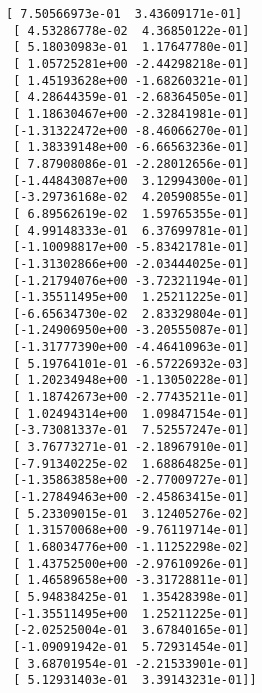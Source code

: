 \documentclass[11pt]{article}
\begin{document}
\begin{Verbatim}[commandchars=\\\{\}]
 [ 7.50566973e-01  3.43609171e-01]
 [ 4.53286778e-02  4.36850122e-01]
 [ 5.18030983e-01  1.17647780e-01]
 [ 1.05725281e+00 -2.44298218e-01]
 [ 1.45193628e+00 -1.68260321e-01]
 [ 4.28644359e-01 -2.68364505e-01]
 [ 1.18630467e+00 -2.32841981e-01]
 [-1.31322472e+00 -8.46066270e-01]
 [ 1.38339148e+00 -6.66563236e-01]
 [ 7.87908086e-01 -2.28012656e-01]
 [-1.44843087e+00  3.12994300e-01]
 [-3.29736168e-02  4.20590855e-01]
 [ 6.89562619e-02  1.59765355e-01]
 [ 4.99148333e-01  6.37699781e-01]
 [-1.10098817e+00 -5.83421781e-01]
 [-1.31302866e+00 -2.03444025e-01]
 [-1.21794076e+00 -3.72321194e-01]
 [-1.35511495e+00  1.25211225e-01]
 [-6.65634730e-02  2.83329804e-01]
 [-1.24906950e+00 -3.20555087e-01]
 [-1.31777390e+00 -4.46410963e-01]
 [ 5.19764101e-01 -6.57226932e-03]
 [ 1.20234948e+00 -1.13050228e-01]
 [ 1.18742673e+00 -2.77435211e-01]
 [ 1.02494314e+00  1.09847154e-01]
 [-3.73081337e-01  7.52557247e-01]
 [ 3.76773271e-01 -2.18967910e-01]
 [-7.91340225e-02  1.68864825e-01]
 [-1.35863858e+00 -2.77009727e-01]
 [-1.27849463e+00 -2.45863415e-01]
 [ 5.23309015e-01  3.12405276e-02]
 [ 1.31570068e+00 -9.76119714e-01]
 [ 1.68034776e+00 -1.11252298e-02]
 [ 1.43752500e+00 -2.97610926e-01]
 [ 1.46589658e+00 -3.31728811e-01]
 [ 5.94838425e-01  1.35428398e-01]
 [-1.35511495e+00  1.25211225e-01]
 [-2.02525004e-01  3.67840165e-01]
 [-1.09091942e-01  5.72931454e-01]
 [ 3.68701954e-01 -2.21533901e-01]
 [ 5.12931403e-01  3.39143231e-01]]
    \end{Verbatim}

    \begin{center}
    \end{center}
    { \hspace*{\fill} \\}
    
\end{document}
